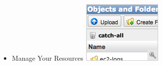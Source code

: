 \documentclass{beamer}
\begin{document}
\begin{frame}[fragile]
\begin{columns}
\begin{itemize}
 \end{itemize}
\begin{itemize}
 \item Manage Your Resources
\includegraphics[width= 0.75 \textwidth]{console_thumb_s3_03.png}
 \end{itemize}
\end{columns}

\end{frame}
\end{document}
